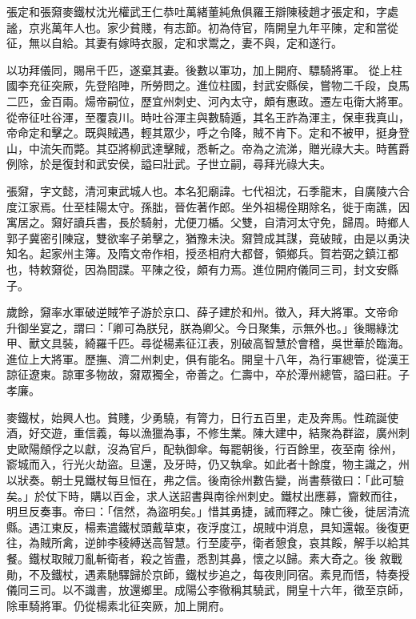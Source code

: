 
\begin{pinyinscope}

 張定和張奫麥鐵杖沈光權武王仁恭吐萬緒董純魚俱羅王辯陳稜趙才張定和，字處謐，京兆萬年人也。家少貧賤，有志節。初為侍官，隋開皇九年平陳，定和當從征，無以自給。其妻有嫁時衣服，定和求鬻之，妻不與，定和遂行。



 以功拜儀同，賜帛千匹，遂棄其妻。後數以軍功，加上開府、驃騎將軍。
 從上柱國李充征突厥，先登陷陣，所勞問之。進位柱國，封武安縣侯，嘗物二千段，良馬二匹，金百兩。煬帝嗣位，歷宜州刺史、河內太守，頗有惠政。遷左屯衛大將軍。從帝征吐谷渾，至覆袁川。時吐谷渾主與數騎遁，其名王詐為渾主，保車我真山，帝命定和擊之。既與賊遇，輕其眾少，呼之令降，賊不肯下。定和不被甲，挺身登山，中流矢而斃。其亞將柳武達擊賊，悉斬之。帝為之流涕，贈光祿大夫。時舊爵例除，於是復封和武安侯，謚曰壯武。子世立嗣，尋拜光祿大夫。



 張奫，字文懿，清河東武城人也。本名犯廟諱。七代祖沈，石季龍末，自廣陵六合度江家焉。仕至桂陽太守。孫朏，晉佐著作郎。坐外祖楊佺期除名，徙于南譙，因寓居之。奫好讀兵書，長於騎射，尤便刀楯。父雙，自清河太守免，歸周。時鄉人郭子冀密引陳寇，雙欲率子弟擊之，猶豫未決。奫贊成其謀，竟破賊，由是以勇決知名。起家州主簿。及隋文帝作相，授丞相府大都督，領鄉兵。賀若弼之鎮江都也，特敕奫從，因為間諜。平陳之役，頗有力焉。進位開府儀同三司，封文安縣子。



 歲餘，奫率水軍破逆賊笮子游於京口、薛子建於和州。徵入，拜大將軍。文帝命
 升御坐宴之，謂曰：「卿可為朕兒，朕為卿父。今日聚集，示無外也。」後賜綠沈甲、獸文具裝，綺羅千匹。尋從楊素征江表，別破高智慧於會稽，吳世華於臨海。進位上大將軍。歷撫、濟二州刺史，俱有能名。開皇十八年，為行軍總管，從漢王諒征遼東。諒軍多物故，奫眾獨全，帝善之。仁壽中，卒於潭州總管，謚曰莊。子孝廉。



 麥鐵杖，始興人也。貧賤，少勇驍，有膂力，日行五百里，走及奔馬。性疏誕使酒，好交遊，重信義，每以漁獵為事，不修生業。陳大建中，結聚為群盜，廣州刺史歐陽頠俘之以獻，沒為官戶，配執御傘。每罷朝後，行百餘里，夜至南
 徐州，窬城而入，行光火劫盜。旦還，及牙時，仍又執傘。如此者十餘度，物主識之，州以狀奏。朝士見鐵杖每旦恒在，弗之信。後南徐州數告變，尚書蔡徵曰：「此可驗矣。」於仗下時，購以百金，求人送詔書與南徐州刺史。鐵杖出應募，齎敕而往，明旦反奏事。帝曰：「信然，為盜明矣。」惜其勇捷，誡而釋之。陳亡後，徙居清流縣。遇江東反，楊素遣鐵杖頭戴草束，夜浮度江，覘賊中消息，具知還報。後復更往，為賊所禽，逆帥李稜縛送高智慧。行至庱亭，衛者憩食，哀其餒，解手以給其餐。鐵杖取賊刀亂斬衛者，殺之皆盡，悉割其鼻，懷之以歸。素大奇之。後
 敘戰勛，不及鐵杖，遇素馳驛歸於京師，鐵杖步追之，每夜則同宿。素見而悟，特奏授儀同三司。以不識書，放還鄉里。成陽公李徹稱其驍武，開皇十六年，徵至京師，除車騎將軍。仍從楊素北征突厥，加上開府。




\end{pinyinscope}
